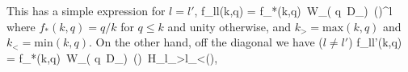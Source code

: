                                                                                                                                                                                                                                                                             This has a simple expression for $l=l'$,
                                                                                                                                                                                                                                                                            \beq
                                                                                                                                                                                                                                                                            f_{ll}(k,q) = f_*(k,q)\, W_( q\, D_)\, \Big(\Big)^l
                                                                                                                                                                                                                                                                            \label{fdiag}
                                                                                                                                                                                                                                                                            \eeq
                                                                                                                                                                                                                                                                            where $f_*(k,q)=q/k$ for $q\leq k$ and unity otherwise, and $k_>=\mathrm{max}(k,q)$ and $k_<=\mathrm{min}(k,q)$. On the other hand, off the diagonal we have ($l \neq l'$)
                                                                                                                                                                                                                                                                            \beq
                                                                                                                                                                                                                                                                            f_{ll'}(k,q) = f_*(k,q)\, W_( q\, D_)\, \Big(\Big) \,H_{l_>l_<}\Big(\Big),
